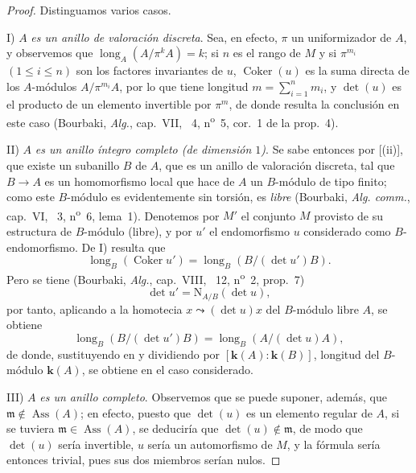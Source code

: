 \begin{proof}
Distinguamos varios casos.

I) $A$ \emph{es un anillo de valoración discreta}.
Sea, en efecto, $\pi$ un uniformizador de $A$, y observemos que $\operatorname{long}_A(A/\pi^kA)=k$;
si $n$ es el rango de $M$ y si $\pi^{m_i}$ $(1\leq i\leq n)$ son los factores invariantes de $u$, $\operatorname{Coker}(u)$ es la suma directa de los $A$-módulos $A/\pi^{m_i}A$, por lo que tiene longitud $m=\sum_{i=1}^nm_i$, y $\det(u)$ es el producto de un elemento invertible por $\pi^m$, de donde resulta la conclusión en este caso (Bourbaki, \emph{Alg.}, cap.~VII, \textsection~4, n\textsuperscript{o}~5, cor.~1 de la prop.~4).

II) $A$ \emph{es un anillo íntegro completo (de dimensión $1$)}.
Se sabe entonces por [(ii)], que existe un subanillo $B$ de $A$, que es un anillo de valoración discreta, tal que $B\to A$ es un homomorfismo local que hace de $A$ un $B$-módulo de tipo finito;
como este $B$-módulo es evidentemente sin torsión, es \emph{libre} (Bourbaki, \emph{Alg. comm.}, cap.~VI, \textsection~3, n\textsuperscript{o}~6, lema~1).
Denotemos por $M'$ el conjunto $M$ provisto de su estructura de $B$-módulo (libre), y por $u'$ el endomorfismo $u$ considerado como $B$-endomorfismo.
De I) resulta que
\[
\label{IV.21.10.17.5}
  \operatorname{long}_B(\operatorname{Coker}u')=\operatorname{long}_B(B/(\det u')B).
  \tag{21.10.17.5}
\]
Pero se tiene (Bourbaki, \emph{Alg.}, cap.~VIII, \textsection~12, n\textsuperscript{o}~2, prop.~7)
\[
  \det u'=\mathrm{N}_{A/B}(\det u),
\]
por tanto, aplicando  a la homotecia $x\leadsto(\det u)x$ del $B$-módulo libre $A$, se obtiene
\[
  \operatorname{long}_B(B/(\det u')B)=\operatorname{long}_B(A/(\det u)A),
\]
de donde, sustituyendo en  y dividiendo por $[\boldsymbol{k}(A):\boldsymbol{k}(B)]$, longitud del $B$-módulo $\boldsymbol{k}(A)$, se obtiene  en el caso considerado.

III) $A$ \emph{es un anillo completo}.
Observemos que se puede suponer, además, que $\mathfrak{m}\notin\operatorname{Ass}(A)$;
en efecto, puesto que $\det(u)$ es un elemento regular de $A$, si se tuviera $\mathfrak{m}\in\operatorname{Ass}(A)$, se deduciría que $\det(u)\notin\mathfrak{m}$, de modo que $\det(u)$ sería invertible, $u$ sería un automorfismo de $M$, y la fórmula  sería entonces trivial, pues sus dos miembros serían nulos.


\end{proof}
